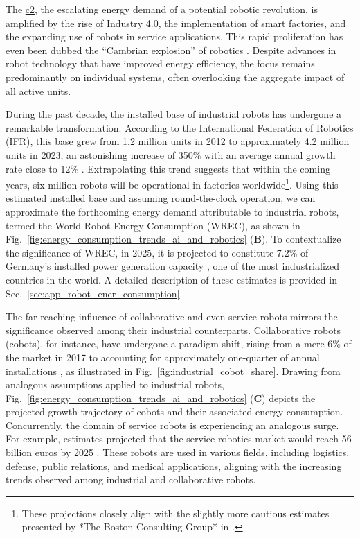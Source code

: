 \documentclass[12pt]{article}
\begin{document}
The \underline{\ac{c2}}, the escalating energy demand of a potential robotic revolution, is amplified by the rise of Industry 4.0, the implementation of smart factories, and the expanding use of robots in service applications. This rapid proliferation has even been dubbed the ``Cambrian explosion'' of robotics \cite{Pratt2015Iscambrianexplosion}. Despite advances in robot technology that have improved energy efficiency, the focus remains predominantly on individual systems, often overlooking the aggregate impact of all active units.

During the past decade, the installed base of industrial robots has undergone a remarkable transformation. According to the International Federation of Robotics (IFR), this base grew from 1.2 million units in 2012 to approximately 4.2 million units in 2023, an astonishing increase of 350\% with an average annual growth rate close to 12\% \cite{IFR2024WorldRobotics2024}. Extrapolating this trend suggests that within the coming years, six million robots will be operational in factories worldwide\footnote{These projections closely align with the slightly more cautious estimates presented by *The Boston Consulting Group* in \cite{Sirkin2015HowRobotsWill}.}. Using this estimated installed base and assuming round-the-clock operation, we can approximate the forthcoming energy demand attributable to industrial robots, termed the World Robot Energy Consumption (WREC), as shown in Fig.~\ref{fig:energy_consumption_trends_ai_and_robotics} (\textbf{B}). To contextualize the significance of WREC, in 2025, it is projected to constitute 7.2\% of Germany's installed power generation capacity \cite{FraunhoferISENetinstalledelectricity}, one of the most industrialized countries in the world. A detailed description of these estimates is provided in Sec.~\ref{sec:app_robot_ener_consumption}.

The far-reaching influence of collaborative and even service robots mirrors the significance observed among their industrial counterparts. Collaborative robots (cobots), for instance, have undergone a paradigm shift, rising from a mere 6\% of the market in 2017 to accounting for approximately one-quarter of annual installations \cite{tobe2015}, as illustrated in Fig.~\ref{fig:industrial_cobot_share}. Drawing from analogous assumptions applied to industrial robots, Fig.~\ref{fig:energy_consumption_trends_ai_and_robotics} (\textbf{C}) depicts the projected growth trajectory of cobots and their associated energy consumption. Concurrently, the domain of service robots is experiencing an analogous surge. For example, estimates projected that the service robotics market would reach 56 billion euros by 2025 \cite{statista_service_robots}. These robots are used in various fields, including logistics, defense, public relations, and medical applications, aligning with the increasing trends observed among industrial and collaborative robots.
\end{document}
